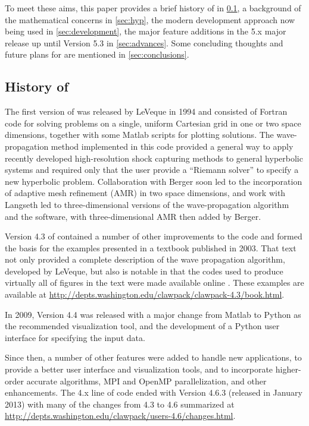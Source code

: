 To meet these aims, this paper provides a brief history of \clawpack in
\cref{sub:history}, a background of the mathematical concerns in \cref{sec:hyp},
the modern development approach now being used in \cref{sec:development},
the major feature additions in the \clawpack 5.x major release up until Version 5.3 in
\cref{sec:advances}. Some concluding thoughts and future plans for
\clawpack are mentioned in
\cref{sec:conclusions}.

\subsection{History of \clawpack} \label{sub:history}

The first version of \clawpack was released by LeVeque in 1994
\cite{clawpack-v1} and consisted of Fortran code for solving problems on a
single, uniform Cartesian
grid in one or two space dimensions, together with some Matlab
\cite{MATLAB:2015a} scripts
for plotting solutions. The wave-propagation method implemented
in this code provided a general way to apply recently developed
high-resolution shock capturing methods to general hyperbolic systems and
required only that the user provide a ``Riemann solver'' to specify a new
hyperbolic problem.
Collaboration with Berger \cite{mjb-rjl:amrclaw}
soon led to the incorporation of adaptive mesh refinement (AMR) in two space
dimensions, and work with Langseth \cite{jol-rjl:3d, jol:thesis}
led to three-dimensional versions of the wave-propagation algorithm and the
software, with three-dimensional AMR then added by Berger.

Version 4.3 of \clawpack contained a number of other improvements to
the code and formed the basis for the examples presented in a textbook
\cite{rjl:fvmhp} published in 2003.  That text not only provided a
complete description of the wave propagation algorithm, developed by LeVeque,
but also is notable in that the codes used to produce virtually all of figures
in the text were made available online \cite{rjl:fvmhp}.  These examples are
available at \url{http://depts.washington.edu/clawpack/clawpack-4.3/book.html}.

In 2009, \clawpack Version 4.4 was released with a major change from Matlab
to Python as the recommended visualization tool, and the development
of a Python user interface for specifying the input data.

Since then, a number of other features were added to handle new
applications, to provide a better user interface and visualization tools, and to
incorporate higher-order accurate algorithms, MPI and OpenMP parallelization, and
other enhancements. The \clawpack 4.x line of code ended with Version 4.6.3
(released in January 2013) with many of the changes from 4.3 to 4.6 summarized at
\url{http://depts.washington.edu/clawpack/users-4.6/changes.html}.

